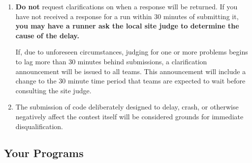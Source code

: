 \begin{enumerate}
\item \textbf{Do not} request clarifications on
  when a response will be returned.  If you have not received a
  response for a run within 30 minutes of submitting it, {\bfseries
  you may have a runner ask the local site judge to determine the
  cause of the delay.}  

  If, due to unforeseen circumstances, judging for one or more
  problems begins to lag more than 30 minutes behind submissions, a
  clarification announcement will be issued to all teams. This
  announcement will include a change to the 30 minute time period that
  teams are expected to wait before consulting the site judge.
  
\item The submission of code deliberately designed to delay, crash, 
  or otherwise negatively affect the contest itself will be
  considered grounds for immediate disqualification.    




\setcounter{savedEnumi}{\value{enumi}}

\end{enumerate}


\subsection*{Your Programs}


